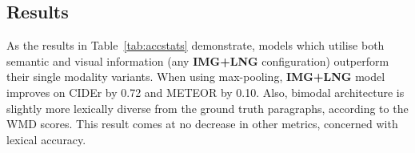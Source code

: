 \documentclass[11pt,a4paper]{article}
\begin{document}

\subsection{Results}

As the results in Table~\ref{tab:accstats} demonstrate, models which utilise both semantic and visual information (any \textbf{IMG+LNG} configuration) outperform their single modality variants.
When using max-pooling, \textbf{IMG+LNG} model improves on CIDEr by 0.72 and METEOR by 0.10.
Also, bimodal architecture is slightly more lexically diverse from the ground truth paragraphs, according to the WMD scores.
This result comes at no decrease in other metrics, concerned with lexical accuracy.
\end{document}
